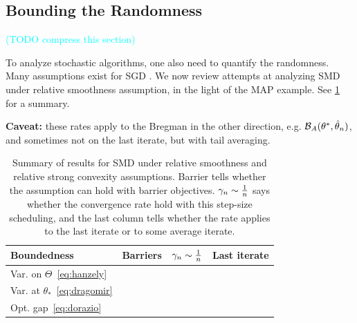 \documentclass[twoside]{article}
\newcommand{\TODO}[1]{\textcolor{cyan}{(TODO #1)}}
\newcommand*{\expect}[2][]{\ensuremath{\mathbb{E}_{#1} \left[ #2 \right] }} %
\newcommand{\logpart}{A}
\newcommand{\bregman}{\cB_\logpart}
\newcommand{\nat}{\theta}
\newcommand{\m}{\mu}
\newcommand{\lr}{\gamma} %
\newcommand{\MAPt}{\hat \nat_n}
\begin{document}
\subsection{Bounding the Randomness}
\TODO{compress this section}

To analyze stochastic algorithms, one also need to quantify the randomness.
Many assumptions exist for SGD \citep[\S3 for a modern review]{khaled2020better}.
We now review attempts at analyzing SMD under relative smoothness assumption, in the light of  the MAP example.
See \cref{tbl:assumptions} for a summary.

\textbf{Caveat:} these rates apply to the Bregman in the other direction, e.g. $\bregman(\nat^*, \MAPt)$, and sometimes not on the last iterate, but with tail averaging.

\begin{table}[t]
\begingroup
\newcommand*{\greencmark}{\textcolor{Green}{\cmark}}
\newcommand*{\redxmark}{\textcolor{Red}{\xmark}}
\centering
\caption{Summary of results for SMD
under relative smoothness and relative strong convexity assumptions.
Barrier tells whether the assumption can hold with barrier objectives.
$\lr_n \sim \inv{n}$ says whether the convergence rate hold with this step-size scheduling, and the last column tells whether the rate applies to the last iterate or to some average iterate.
}
\begin{tabular}{lccc}
\toprule
Boundedness & Barriers &  $\lr_n \sim \inv{n}$ & Last iterate \\
\midrule
Var. on $\Theta$~\eqref{eq:hanzely} %
& \redxmark & \greencmark  & \redxmark
\\
Var. at $\theta_*$~\eqref{eq:dragomir} %
& \redxmark & \greencmark  & \greencmark
\\
Opt. gap~\eqref{eq:dorazio} %
& \greencmark & \redxmark & \greencmark
\\
\bottomrule
\end{tabular}
\label{tbl:assumptions}
\endgroup
\end{table}
\end{document}

